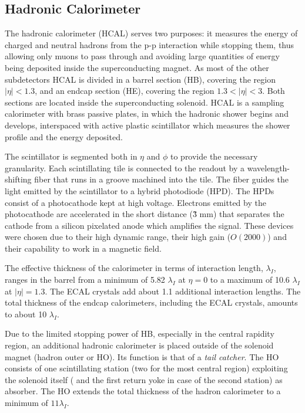 \subsection{Hadronic Calorimeter}

The hadronic calorimeter (HCAL) serves two purposes: it measures the energy of charged and neutral hadrons from the p-p interaction while stopping them, thus allowing only muons to pass through and avoiding large quantities of energy being deposited inside the superconducting magnet. As most of the other subdetectors HCAL is divided in a barrel section (HB), covering the region $|\eta| < 1.3$, and an endcap section (HE), covering the region $1.3 < |\eta| < 3$. Both sections are located inside the superconducting solenoid. HCAL is a sampling calorimeter with brass passive plates, in which the hadronic shower begins and develops, interspaced with active plastic scintillator which measures the shower profile and the energy deposited. 

The scintillator is segmented both in $\eta$ and $\phi$ to provide the necessary granularity. Each scintillating tile is connected to the readout by a wavelength-shifting fiber that runs in a groove machined into the tile. The fiber guides the light emitted by the scintillator to a hybrid photodiode (HPD). The HPDs consist of a photocathode kept at high voltage. Electrons emitted by the photocathode are accelerated in the short distance (\~3 mm) that separates the cathode from a silicon pixelated anode which amplifies the signal. These devices were chosen due to their high dynamic range, their high gain ($O(2000)$) and their capability to work in a magnetic field.

The effective thickness of the calorimeter in terms of interaction length, $\lambda_I$, ranges in the barrel from a minimum of 5.82 $\lambda_I$ at $\eta=0$ to a maximum of 10.6 $\lambda_I$ at $|\eta| = 1.3$. The ECAL crystals add about 1.1 additional interaction lengths. The total thickness of the endcap calorimeters, including the ECAL crystals, amounts to about 10 $\lambda_I$.

Due to the limited stopping power of HB, especially in the central rapidity region, an additional hadronic calorimeter is placed outside of the solenoid magnet (hadron outer or HO). Its function is that of a \emph{tail catcher}. The HO consists of one scintillating station (two for the most central region) exploiting the solenoid itself ( and the first return yoke in case of the second station) as absorber. The HO extends the total thickness of the hadron calorimeter to a minimum of $11 \lambda_I$.


